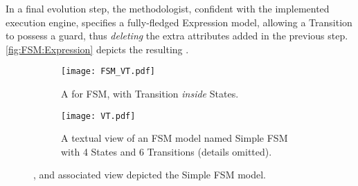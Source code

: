 In a final evolution step, the methodologist, confident with the implemented
execution engine, specifies a fully-fledged \textsf{Expression} model,
allowing a \textsf{Transition} to possess a \textsf{guard}, thus \emph{deleting}
the extra attributes added in the previous step. \cref{fig:FSM:Expression} depicts the resulting \metamodel.


\begin{figure}
    \centering
    \begin{subfigure}[b]{\columnwidth}
			\centering
      \texttt{[image: FSM\_VT.pdf]}
      \caption{A \viewtype for \textsf{FSM}, with \textsf{Transition} \emph{inside} \textsf{State}s.}
      \label{fig:VT:VMM}
    \end{subfigure}
    \hfill
    \begin{subfigure}[b]{\columnwidth}
			\centering
      \texttt{[image: VT.pdf]}
      \caption{A textual view of an \textsf{FSM} model named \textsf{Simple FSM} with 4 \textsf{States} and 6 \textsf{Transitions} (details omitted).}
      \label{fig:VT:TM}
    \end{subfigure}
    \caption{\Viewtype, and associated view depicted the \textsf{Simple FSM} model.}
    \label{fig:VT}
\end{figure}

